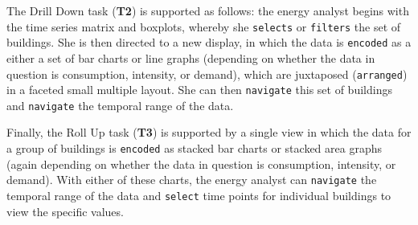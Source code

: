 The Drill Down task ({\bf T2}) is supported as follows: the energy analyst begins with the time series matrix and boxplots, whereby she {\tt selects} or {\tt filters} the set of buildings.
She is then directed to a new display, in which the data is {\tt encoded} as a either a set of bar charts or line graphs (depending on whether the data in question is consumption, intensity, or demand), which are juxtaposed ({\tt arranged}) in a faceted small multiple layout.
She can then {\tt navigate} this set of buildings and {\tt navigate} the temporal range of the data.

Finally, the Roll Up task ({\bf T3}) is supported by a single view in which the data for a group of buildings is {\tt encoded} as stacked bar charts or stacked area graphs (again depending on whether the data in question is consumption, intensity, or demand).
With either of these charts, the energy analyst can {\tt navigate} the temporal range of the data and {\tt select} time points for individual buildings to view the specific values.


